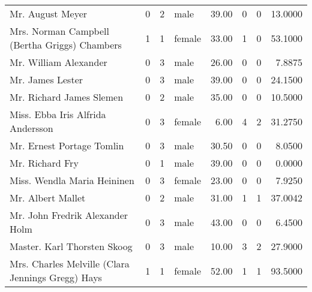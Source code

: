 \begin{tabular}{lrrlrrrr}
Mr. August Meyer                                   &         0 &       2 &    male &  39.00 &                        0 &                        0 &   13.0000 \\
Mrs. Norman Campbell (Bertha Griggs) Chambers      &         1 &       1 &  female &  33.00 &                        1 &                        0 &   53.1000 \\
Mr. William Alexander                              &         0 &       3 &    male &  26.00 &                        0 &                        0 &    7.8875 \\
Mr. James Lester                                   &         0 &       3 &    male &  39.00 &                        0 &                        0 &   24.1500 \\
Mr. Richard James Slemen                           &         0 &       2 &    male &  35.00 &                        0 &                        0 &   10.5000 \\
Miss. Ebba Iris Alfrida Andersson                  &         0 &       3 &  female &   6.00 &                        4 &                        2 &   31.2750 \\
Mr. Ernest Portage Tomlin                          &         0 &       3 &    male &  30.50 &                        0 &                        0 &    8.0500 \\
Mr. Richard Fry                                    &         0 &       1 &    male &  39.00 &                        0 &                        0 &    0.0000 \\
Miss. Wendla Maria Heininen                        &         0 &       3 &  female &  23.00 &                        0 &                        0 &    7.9250 \\
Mr. Albert Mallet                                  &         0 &       2 &    male &  31.00 &                        1 &                        1 &   37.0042 \\
Mr. John Fredrik Alexander Holm                    &         0 &       3 &    male &  43.00 &                        0 &                        0 &    6.4500 \\
Master. Karl Thorsten Skoog                        &         0 &       3 &    male &  10.00 &                        3 &                        2 &   27.9000 \\
Mrs. Charles Melville (Clara Jennings Gregg) Hays  &         1 &       1 &  female &  52.00 &                        1 &                        1 &   93.5000 \\

\end{tabular}
